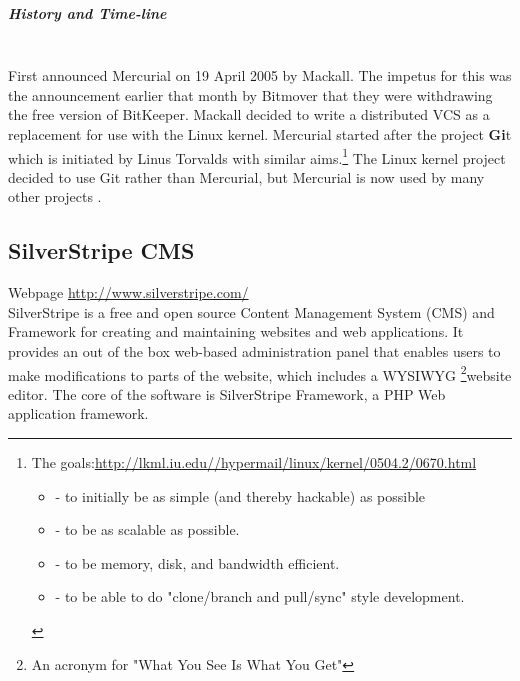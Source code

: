\documentclass[11pt]{article} %
\begin{document}
  \subparagraph{History and Time-line} \mbox{} \\
    First announced Mercurial on 19 April 2005 by Mackall. The impetus for this was the announcement earlier that month by Bitmover that they were withdrawing the free version of BitKeeper. Mackall decided to write a distributed VCS as a replacement for use with the Linux kernel.
Mercurial started  after the project  {\bf Gi}t which is  initiated by Linus Torvalds with similar aims.\footnote{ The goals:\url{http://lkml.iu.edu//hypermail/linux/kernel/0504.2/0670.html}
\begin{itemize}
\item - to initially be as simple (and thereby hackable) as possible

\item- to be as scalable as possible.

\item- to be memory, disk, and bandwidth efficient.

\item- to be able to do "clone/branch and pull/sync" style development. \end{itemize}
}
The Linux kernel project decided to use Git rather than Mercurial, but Mercurial is now used by many other projects .


\subsection{SilverStripe CMS} 
Webpage \url{http://www.silverstripe.com/}\\
   SilverStripe is a free and open source Content Management System (CMS) and Framework for creating and maintaining websites and web applications. It provides an out of the box web-based administration panel that enables users to make modifications to parts of the website, which includes a WYSIWYG \footnote{ An acronym for "What You See Is What You Get"}website editor. The core of the software is SilverStripe Framework, a PHP Web application framework.
  
\end{document}
